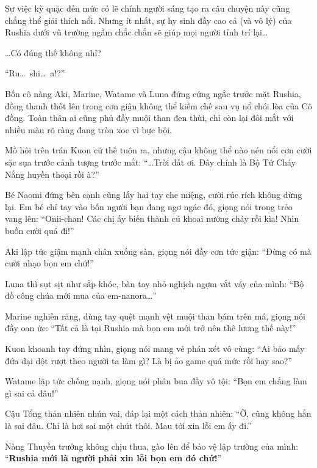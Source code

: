 \documentclass[../main.tex]{subfiles}
\begin{document}
Sự việc kỳ quặc đến mức có lẽ chính người sáng tạo ra câu chuyện này cũng chẳng thể giải thích nổi. Nhưng ít nhất, sự hy sinh đầy cao cả (và vô lý) của Rushia dưới vũ trường ngầm chắc chắn sẽ giúp mọi người tỉnh trí lại\dots

\dots Có đúng thế không nhỉ?

\omk

``Ru\dots\ shi\dots\ a!?''

Bốn cô nàng Aki, Marine, Watame và Luna đứng cứng ngắc trước mặt Rushia, đồng thanh thốt lên trong cơn giận không thể kiềm chế sau vụ nổ chói lòa của Cô đồng. Toàn thân ai cũng phủ đầy muội than đen thùi, chỉ còn lại đôi mắt với nhiều màu rõ ràng đang tròn xoe vì bực bội.


Mồ hôi trên trán Kuon cứ thế tuôn ra, nhưng cậu không thể nào nén nổi cơn cười sặc sụa trước cảnh tượng trước mắt: ``\dots Trời đất ơi. Đây chính là Bộ Tứ Cháy Nắng huyền thoại rồi à?''

Bé Naomi đứng bên cạnh cũng lấy hai tay che miệng, cười rúc rích không dừng lại. Em bé chỉ tay vào bốn người bạn đang ngơ ngác đó, giọng nói trong trẻo vang lên: ``Onii-chan! Các chị ấy biến thành củ khoai nướng cháy rồi kìa! Nhìn buồn cười quá đi!''

Aki lập tức giậm mạnh chân xuống sàn, giọng nói đầy cơn tức giận: ``Đừng có mà cười nhạo bọn em chứ!''

Luna thì sụt sịt như sắp khóc, bàn tay nhỏ nghịch ngợm vắt váy của mình: ``Bộ đồ công chúa mới mua của em-nanora\dots''

Marine nghiến răng, dùng tay quệt mạnh vệt muội than bám trên má, giọng nói đầy oan ức: ``Tất cả là tại Rushia mà bọn em mới trở nên thê lương thế này!''

Kuon khoanh tay đứng nhìn, giọng nói mang vẻ phán xét vô cùng: ``Ai bảo mấy đứa dại dột rượt theo người ta làm gì? Là bị ảo game quá mức rồi hay sao?''

Watame lập tức chống nạnh, giọng nói phân bua đầy vô tội: ``Bọn em chẳng làm gì sai cả đâu!''

Cậu Tổng thản nhiên nhún vai, đáp lại một cách thản nhiên: ``Ờ, cũng không hẳn là sai đâu. Chỉ là hơi sai một chút thôi. Mau tới xin lỗi em ấy đi.''

Nàng Thuyền trưởng không chịu thua, gào lên để bảo vệ lập trường của mình: ``\textbf{Rushia mới là người phải xin lỗi bọn em đó chứ!}''
\end{document}
